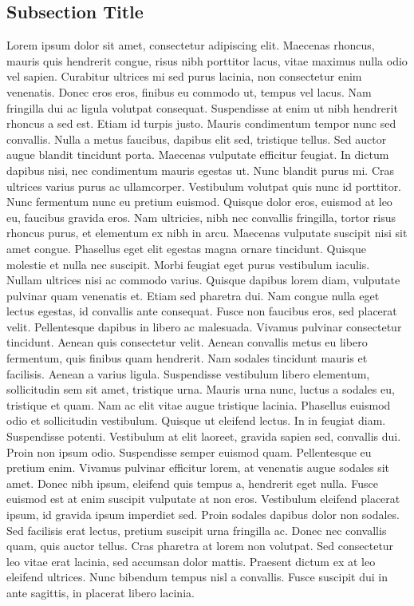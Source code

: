 \subsection{Subsection Title}
Lorem ipsum dolor sit amet, consectetur adipiscing elit. Maecenas rhoncus, mauris quis hendrerit congue, risus nibh porttitor lacus, vitae maximus nulla odio vel sapien. Curabitur ultrices mi sed purus lacinia, non consectetur enim venenatis. Donec eros eros, finibus eu commodo ut, tempus vel lacus. Nam fringilla dui ac ligula volutpat consequat. Suspendisse at enim ut nibh hendrerit rhoncus a sed est. Etiam id turpis justo. Mauris condimentum tempor nunc sed convallis. Nulla a metus faucibus, dapibus elit sed, tristique tellus. Sed auctor augue blandit tincidunt porta.
Maecenas vulputate efficitur feugiat. In dictum dapibus nisi, nec condimentum mauris egestas ut. Nunc blandit purus mi. Cras ultrices varius purus ac ullamcorper. Vestibulum volutpat quis nunc id porttitor. Nunc fermentum nunc eu pretium euismod. Quisque dolor eros, euismod at leo eu, faucibus gravida eros. Nam ultricies, nibh nec convallis fringilla, tortor risus rhoncus purus, et elementum ex nibh in arcu. Maecenas vulputate suscipit nisi sit amet congue. Phasellus eget elit egestas magna ornare tincidunt. Quisque molestie et nulla nec suscipit. Morbi feugiat eget purus vestibulum iaculis.
Nullam ultrices nisi ac commodo varius. Quisque dapibus lorem diam, vulputate pulvinar quam venenatis et. Etiam sed pharetra dui. Nam congue nulla eget lectus egestas, id convallis ante consequat. Fusce non faucibus eros, sed placerat velit. Pellentesque dapibus in libero ac malesuada. Vivamus pulvinar consectetur tincidunt. Aenean quis consectetur velit. Aenean convallis metus eu libero fermentum, quis finibus quam hendrerit. Nam sodales tincidunt mauris et facilisis. Aenean a varius ligula. Suspendisse vestibulum libero elementum, sollicitudin sem sit amet, tristique urna. Mauris urna nunc, luctus a sodales eu, tristique et quam.
Nam ac elit vitae augue tristique lacinia. Phasellus euismod odio et sollicitudin vestibulum. Quisque ut eleifend lectus. In in feugiat diam. Suspendisse potenti. Vestibulum at elit laoreet, gravida sapien sed, convallis dui. Proin non ipsum odio. Suspendisse semper euismod quam. Pellentesque eu pretium enim. Vivamus pulvinar efficitur lorem, at venenatis augue sodales sit amet. Donec nibh ipsum, eleifend quis tempus a, hendrerit eget nulla.
Fusce euismod est at enim suscipit vulputate at non eros. Vestibulum eleifend placerat ipsum, id gravida ipsum imperdiet sed. Proin sodales dapibus dolor non sodales. Sed facilisis erat lectus, pretium suscipit urna fringilla ac. Donec nec convallis quam, quis auctor tellus. Cras pharetra at lorem non volutpat. Sed consectetur leo vitae erat lacinia, sed accumsan dolor mattis. Praesent dictum ex at leo eleifend ultrices. Nunc bibendum tempus nisl a convallis. Fusce suscipit dui in ante sagittis, in placerat libero lacinia. 

